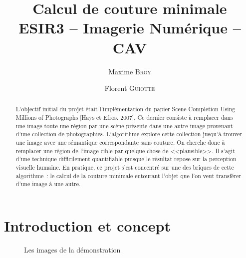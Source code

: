 \documentclass[a4paper]{article}
\title{Calcul de couture minimale \\ {\large ESIR3 -- Imagerie Numérique -- CAV}}
\author{Maxime \textsc{Broy} \and Florent \textsc{Guiotte}}
\begin{document}
\maketitle 
\begin{abstract}
L'objectif initial du projet était l'implémentation du papier Scene Completion Using Millions of Photographs [Hays et Efros. 2007]. 
Ce dernier consiste à remplacer dans une image toute une région par une scène présente dans une autre image provenant d'une collection de photographies. 
L'algorithme explore cette collection jusqu'à trouver une image avec une sémantique correspondante sans couture.
On cherche donc à remplacer une région de l'image cible par quelque chose de <<plausible>>. 
Il s'agit d'une technique difficilement quantifiable puisque le résultat repose sur la perception visuelle humaine. 
En pratique, ce projet s'est concentré sur une des briques de cette algorithme~: 
le calcul de la couture minimale entourant l'objet que l'on veut transférer d'une image à une autre. 
\end{abstract}

\tableofcontents

\section{Introduction et concept}               %

\begin{figure}[!ht]%
    \centering
    \hspace{0.030\textwidth}
    \caption{Les images de la démonstration}
    \label{pres}
\end{figure}
\end{document}
